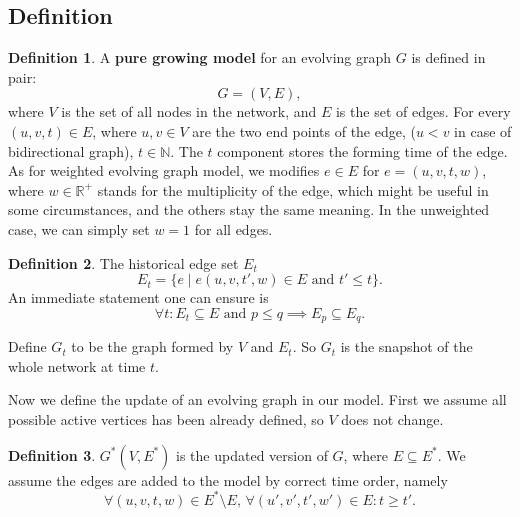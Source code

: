 \documentclass[12pt,abstract=true]{scrartcl}
\numberwithin{equation}{section}
\theoremstyle{definition}   \newtheorem{definition}{Definition}[section]
\theoremstyle{plain}        \newtheorem{theorem}{Theorem}[section]
\theoremstyle{plain}        \newtheorem{observation}{Observation}[section]
\theoremstyle{plain}        \newtheorem{fact}{Fact}[section]
\theoremstyle{plain}        \newtheorem{claim}{Claim}[section]
\theoremstyle{plain}        \newtheorem{lemma}[theorem]{Lemma}
\theoremstyle{plain}        \newtheorem{corollary}[theorem]{Corollary}
\theoremstyle{remark}       \newtheorem{example}{Example}[section]
\theoremstyle{remark}       \newtheorem{remark}{Remark}[section]
\begin{document}
\subsection{Definition}
\begin{definition}
A \textbf{pure growing model} for an evolving graph $G$ is defined in pair:
\begin{equation}
G=(V,E),
\end{equation}
where $V$ is the set of all nodes in the network, and $E$ is the set of edges.
For every $(u,v,t)\in E$, where $u,v\in V$ are the two end
points of the edge, ($u<v$ in case of bidirectional graph),
$t\in \mathbb{N}$. The $t$
component stores the forming time of the edge. As for weighted evolving graph
model, we modifies $e\in E$ for $e=(u,v,t,w)$, where $w\in\mathbb{R}^+$ stands
for the multiplicity of the edge, which might be useful in some circumstances,
and the others stay the same meaning. In the unweighted case, we can simply set
$w=1$ for all edges.
\end{definition}

\begin{definition}
The historical edge set $E_t$
\begin{equation}
E_t=\{e\;|\;e(u,v,t',w)\in E\text{ and }t'\leq t\}.
\end{equation}
An immediate statement one can ensure is
\begin{equation}
\forall t: E_t\subseteq E\text{ and }p\leq q\implies E_p\subseteq E_q.
\end{equation}

Define $G_t$ to be the graph formed by $V$ and $E_t$. So $G_t$ is the snapshot
of the whole network at time $t$.
\end{definition}

Now we define the update of an evolving graph in our model. First we assume all
possible active vertices has been already defined, so $V$ does not change.

\begin{definition}
$G^*(V,E^*)$ is the updated version of $G$, where $E\subseteq E^*$. We assume
the edges are added to the
model by correct time order, namely
\begin{equation}
\forall (u,v,t,w) \in E^*\setminus E,\, \forall (u',v',t',w')\in E: t \geq t'.
\end{equation}
\end{definition}
\end{document}
